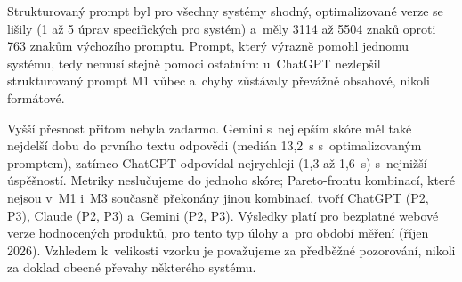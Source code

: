 \documentclass[11pt,a4paper]{article}
\begin{document}
Strukturovaný prompt byl pro všechny systémy shodný, optimalizované
verze se lišily (1 až 5 úprav specifických pro systém) a~měly 3114 až
5504 znaků oproti 763 znakům výchozího promptu. Prompt, který výrazně
pomohl jednomu systému, tedy nemusí stejně pomoci ostatním: u~ChatGPT
nezlepšil strukturovaný prompt M1 vůbec a~chyby zůstávaly převážně
obsahové, nikoli formátové.

Vyšší přesnost přitom nebyla zadarmo. Gemini s~nejlepším skóre měl
také nejdelší dobu do prvního textu odpovědi (medián 13,2~s
s~optimalizovaným promptem), zatímco ChatGPT odpovídal nejrychleji
(1,3 až 1,6~s) s~nejnižší úspěšností. Metriky neslučujeme do jednoho
skóre; Pareto-frontu kombinací, které nejsou v~M1 i~M3 současně
překonány jinou kombinací, tvoří ChatGPT (P2, P3), Claude (P2, P3)
a~Gemini (P2, P3). Výsledky platí pro bezplatné webové
verze hodnocených produktů, pro tento typ úlohy a~pro období měření
(říjen 2026). Vzhledem k~velikosti vzorku je považujeme za předběžné
pozorování, nikoli za doklad obecné převahy některého systému.
\end{document}
